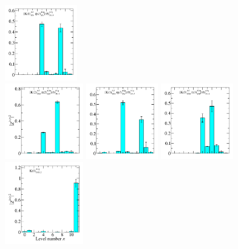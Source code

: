 \begin{figure}
  \includegraphics[width=0.28\textwidth]{figures/spectrum_a1g/with_tq/zfactors/zfactor_isodoublet_kaon_phi-A1g_1-P001-A2-SS_1-P00-1-A2p-SS_1.pdf}\\
  \includegraphics[width=0.304\textwidth]{figures/spectrum_a1g/with_tq/zfactors/zfactor_isodoublet_kaon_pion-A1g_1-P011-A2-SS_0-P0-1-1-A2m-SS_0.pdf}
  \includegraphics[width=0.28\textwidth]{figures/spectrum_a1g/with_tq/zfactors/zfactor_isodoublet_kaon_eta-A1g_1-P001-A2-SS_1-P00-1-A2p-SS_1.pdf}
  \includegraphics[width=0.28\textwidth]{figures/spectrum_a1g/with_tq/zfactors/zfactor_isodoublet_kaon_pion-A1g_1-P111-A2-SS_0-P-1-1-1-A2m-SS_0.pdf}\\
  \includegraphics[width=0.304\textwidth]{figures/spectrum_a1g/with_tq/zfactors/zfactor_kaon-P000-A1g_1-DDL_2.pdf}

\end{figure}
